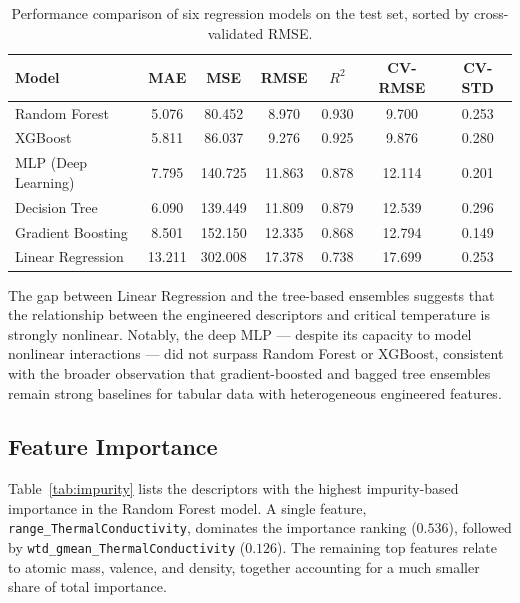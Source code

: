 \documentclass[11pt]{article}
\begin{document}
\begin{table}[htbp]
\centering
\caption{Performance comparison of six regression models on the test set, sorted by cross-validated RMSE.}
\label{tab:models}
\begin{tabular}{l S S S S S S}
\toprule
\textbf{Model} & {\textbf{MAE}} & {\textbf{MSE}} & {\textbf{RMSE}} & {\textbf{$R^2$}}
 & {\textbf{CV-RMSE}} & {\textbf{CV-STD}} \\
\midrule
Random Forest        & 5.076 & 80.452  & 8.970  & 0.930 & 9.700  & 0.253 \\
XGBoost              & 5.811 & 86.037  & 9.276  & 0.925 & 9.876  & 0.280 \\
MLP (Deep Learning)  & 7.795 & 140.725 & 11.863 & 0.878 & 12.114 & 0.201 \\
Decision Tree        & 6.090 & 139.449 & 11.809 & 0.879 & 12.539 & 0.296 \\
Gradient Boosting    & 8.501 & 152.150 & 12.335 & 0.868 & 12.794 & 0.149 \\
Linear Regression    & 13.211& 302.008 & 17.378 & 0.738 & 17.699 & 0.253 \\
\bottomrule
\end{tabular}
\end{table}

The gap between Linear Regression and the tree-based ensembles suggests that the relationship between the
engineered descriptors and critical temperature is strongly nonlinear. Notably, the deep MLP --- despite
its capacity to model nonlinear interactions --- did not surpass Random Forest or XGBoost, consistent with
the broader observation that gradient-boosted and bagged tree ensembles remain strong baselines for
tabular data with heterogeneous engineered features.

\subsection{Feature Importance}
Table~\ref{tab:impurity} lists the descriptors with the highest impurity-based importance in the Random
Forest model. A single feature, \texttt{range\_ThermalConductivity}, dominates the importance ranking
($0.536$), followed by \texttt{wtd\_gmean\_ThermalConductivity} ($0.126$). The remaining top features
relate to atomic mass, valence, and density, together accounting for a much smaller share of total
importance.
\end{document}
